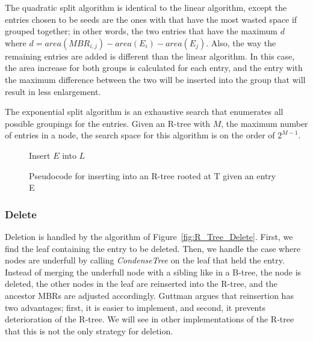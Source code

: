 The quadratic split algorithm is identical to the linear algorithm, except the 
entries chosen to be seeds are the ones with that have the most wasted space
if grouped together; in other words, the two entries that have the maximum $d$
where $d = area(MBR_{i,j}) - area(E_{i}) - area(E_{j}) $.
Also, the way the remaining entries are added is different than the linear 
algorithm. In this case, the area increase for both groups is calculated for each
entry, and the entry with the maximum difference between the two will be inserted 
into the group that will result in less enlargement.

The exponential split algorithm is an exhaustive search that enumerates all possible
groupings for the entries. Given an R-tree with $M$, the maximum number of entries
in a node, the search space for this algorithm is on the order of $2^{M-1}$.

\begin{figure}[t]
\begin{algorithmic}
		\State {}
			\State Insert $E$ into $L$
		\Else
			\State {}
		\EndIf
		\State {}
	\EndFunction
\end{algorithmic}
\caption{Pseudocode for inserting into an R-tree rooted at T given an entry E}
\label{fig:R_Tree_Insert}
\end{figure}

\subsubsection{Delete}
Deletion is handled by the algorithm of Figure~\ref{fig:R_Tree_Delete}. First,
we find the leaf containing the entry to be deleted. Then, we handle the case
where nodes are underfull by calling \emph{CondenseTree} on the leaf that held
the entry. Instead of merging the underfull node with a sibling like in a 
B-tree, the node is deleted, the other nodes in the leaf are reinserted into 
the R-tree, and the ancestor MBRs are adjusted accordingly. Guttman argues that
reinsertion has two advantages; first, it is easier to implement, and second, 
it prevents deterioration of the R-tree. We will see in other implementations
of the R-tree that this is not the only strategy for deletion.

